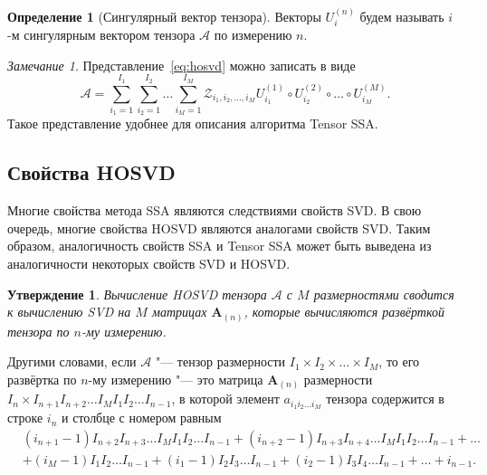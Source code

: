 \documentclass[specialist,
    substylefile = spbu_report.rtx,
    subf,href,colorlinks=true, 12pt]{disser}
\theoremstyle{plain}
\newtheorem{statement}{Утверждение}[section]
\theoremstyle{definition}
\newtheorem{definition}{Определение}[section]
\theoremstyle{remark}
\newtheorem*{remark}{Замечание}
\begin{document}
    \begin{definition}[Сингулярный вектор тензора]
        \label{def:singular-tensor}
        Векторы $U_i^{(n)}$ будем называть $i$-м сингулярным вектором тензора $\mathcal A$ по измерению $n$.
    \end{definition}
    \begin{remark}
        Представление~\eqref{eq:hosvd} можно записать в виде
        \begin{equation}
            \mathcal{A}=\sum_{i_1=1}^{I_1} \sum_{i_2=1}^{I_2}\ldots \sum_{i_M=1}^{I_M} \mathcal{Z}_{i_1,i_2,\ldots,i_M}
            U^{(1)}_{i_1} \circ U^{(2)}_{i_2} \circ \ldots\circ U^{(M)}_{i_M}.\label{eq:sum-hosvd}
        \end{equation}
        Такое представление удобнее для описания алгоритма Tensor SSA\@.
    \end{remark}

    \subsection{Свойства HOSVD}\label{subsec:hosvd-properties}
    Многие свойства метода SSA являются следствиями свойств SVD\@.
    В свою очередь, многие свойства HOSVD являются аналогами свойств SVD\@.
    Таким образом, аналогичность свойств SSA и Tensor SSA может быть выведена из аналогичности некоторых свойств SVD и HOSVD\@.
    \begin{statement}
        Вычисление \emph{HOSVD} тензора $\mathcal{A}$ с $M$ размерностями сводится к вычислению \emph{SVD} на $M$ матрицах $\mathbf{A}_{(n)}$,
        которые вычисляются развёрткой тензора по $n$-му измерению.\label{state:hosvd-to-svd}
    \end{statement}
    Другими словами, если $\mathcal{A}$ "--- тензор размерности $I_1\times I_2\times\ldots\times I_M$, то его развёртка
    по $n$-му измерению "--- это матрица $\mathbf{A}_{(n)}$ размерности $I_n\times I_{n+1}I_{n+2}\ldots I_{M}I_{1}I_{2}\ldots
    I_{n-1}$, в которой элемент $a_{i_1 i_2\ldots i_M}$ тензора содержится в строке $i_n$ и столбце с номером равным
    \[\begin{aligned}
          &(i_{n+1} - 1)I_{n+2}I_{n+3}\ldots I_{M}I_1 I_2\ldots I_{n-1} + (i_{n+2} - 1)I_{n+3}I_{n+4}\ldots I_M I_1 I_2 \ldots
          I_{n-1} + \dots \\
          &+(i_M - 1)I_1 I_2 \ldots I_{n-1} + (i_1 - 1)I_2 I_3\ldots I_{n-1} + (i_2 - 1)I_3 I_4\ldots I_{n-1} + \dots + i_{n-1}.
    \end{aligned}
    \]
\end{document}
